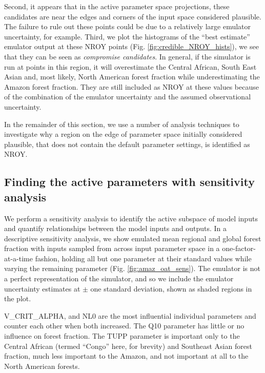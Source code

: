 \documentclass[esd, article]{copernicus} %
\begin{document}
Second, it appears that in the active parameter space projections, these candidates are near the edges and corners of the input space considered plausible. The failure to rule out these points could be due to a relatively large emulator uncertainty, for example. Third, we plot the histograms of the ``best estimate'' emulator output at these NROY points (Fig.  \ref{fig:credible_NROY_hists}), we see that they can be seen as \emph{compromise candidates}. In general, if the simulator is run at points in this region, it will overestimate the Central African, South East Asian and, most likely, North American forest fraction while underestimating the Amazon forest fraction. They are still included as NROY at these values because of the combination of the emulator uncertainty and the assumed observational uncertainty.


In the remainder of this section, we use a number of analysis techniques to investigate why a region on the edge of parameter space initially considered plausible, that does not contain the default parameter settings, is identified as NROY.

\subsection{Finding the active parameters with sensitivity analysis}\label{ssec:sensitivity}

We perform a sensitivity analysis to identify the active subspace of model inputs and quantify relationships between the model inputs and outputs. In a descriptive sensitivity analysis, we show emulated mean regional and global forest fraction with inputs sampled from across input parameter space in a one-factor-at-a-time fashion, holding all but one parameter at their standard values while varying the remaining parameter (Fig.  \ref{fig:amaz_oat_sens}). The emulator is not a perfect representation of the simulator, and so we include the emulator uncertainty estimates at $\pm$ one standard deviation, shown as shaded regions in the plot.

V\_CRIT\_ALPHA, and NL0 are the most influential individual parameters and counter each other when both increased. The Q10 parameter has little or no influence on forest fraction. The TUPP parameter is important only to the Central African (termed ``Congo'' here, for brevity) and Southeast Asian forest fraction, much less important to the Amazon, and not important at all to the North American forests. 
\end{document}
